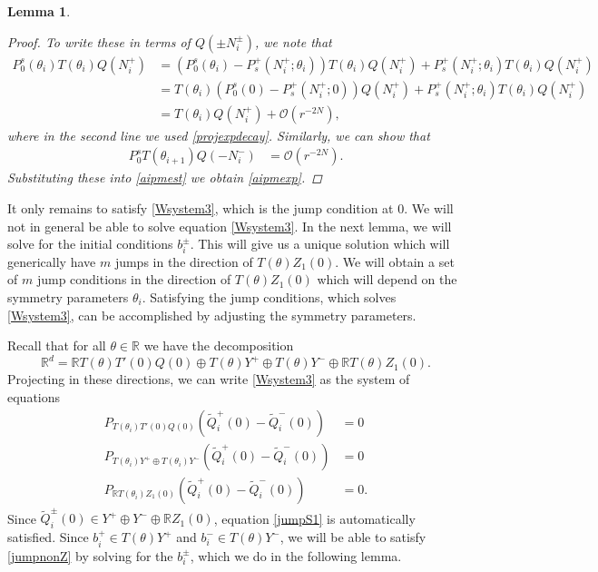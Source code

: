 \documentclass[12pt]{elsarticle}
\def\R{{\mathbb R}}
\newtheorem{lemma}{Lemma}
\begin{document}
\begin{lemma}
\begin{proof}
To write these in terms of $Q(\pm N_i^\pm)$, we note that
\begin{align*}
P_0^s(\theta_i) T(\theta_i) Q(N_i^+) &= (P_0^s(\theta_i) - P_s^+(N_i^+; \theta_i)) T(\theta_i) Q(N_i^+) + P_s^+(N_i^+; \theta_i) T(\theta_i) Q(N_i^+) \\
&= T(\theta_i)(P_0^s(0) - P_s^+(N_i^+; 0)) Q(N_i^+) + P_s^+(N_i^+; \theta_i) T(\theta_i) Q(N_i^+) \\
&= T(\theta_i) Q(N_i^+) + \mathcal{O}(r^{-2N}),
\end{align*}
where in the second line we used \cref{projexpdecay}. Similarly, we can show that 
\begin{align*}
P_0^s T(\theta_{i+1}) Q(-N_i^-) &= \mathcal{O}(r^{-2N}).
\end{align*}
Substituting these into \cref{aipmest} we obtain \cref{aipmexp}.
\end{proof}
\end{lemma}

It only remains to satisfy \cref{Wsystem3}, which is the jump condition at 0. We will not in general be able to solve equation \cref{Wsystem3}. In the next lemma, we will solve for the initial conditions $b_i^\pm$. This will give us a unique solution which will generically have $m$ jumps in the direction of $T(\theta) Z_1(0)$. We will obtain a set of $m$ jump conditions in the direction of $T(\theta) Z_1(0)$ which will depend on the symmetry parameters $\theta_i$. Satisfying the jump conditions, which solves \cref{Wsystem3}, can be accomplished by adjusting the symmetry parameters.

Recall that for all $\theta \in \R$ we have the decomposition
\[
\R^d = \R T(\theta) T'(0)Q(0) \oplus T(\theta) Y^+ \oplus T(\theta) Y^- \oplus \R T(\theta) Z_1(0).
\]
Projecting in these directions, we can write \cref{Wsystem3} as the system of equations
\begin{align}
P_{T(\theta_i)T'(0)Q(0)}\left( \tilde{Q}_i^+(0) - \tilde{Q}_i^-(0) \right) &= 0 \label{jumpS1} \\
P_{T(\theta_i)Y^+ \oplus T(\theta_i)Y^-}\left( \tilde{Q}_i^+(0) - \tilde{Q}_i^-(0) \right) &= 0 \label{jumpnonZ} \\
P_{\R T(\theta_i)Z_1(0)} \left( \tilde{Q}_i^+(0) - \tilde{Q}_i^-(0) \right) &= 0 . \label{jumpZ}
\end{align}
Since $\tilde{Q}_i^\pm(0) \in Y^+ \oplus Y^- \oplus \R Z_1(0)$, equation \cref{jumpS1} is automatically satisfied. Since $b_i^+ \in T(\theta) Y^+$ and $b_i^- \in T(\theta) Y^-$, we will be able to satisfy \cref{jumpnonZ} by solving for the $b_i^\pm$, which we do in the following lemma.
\end{document}
